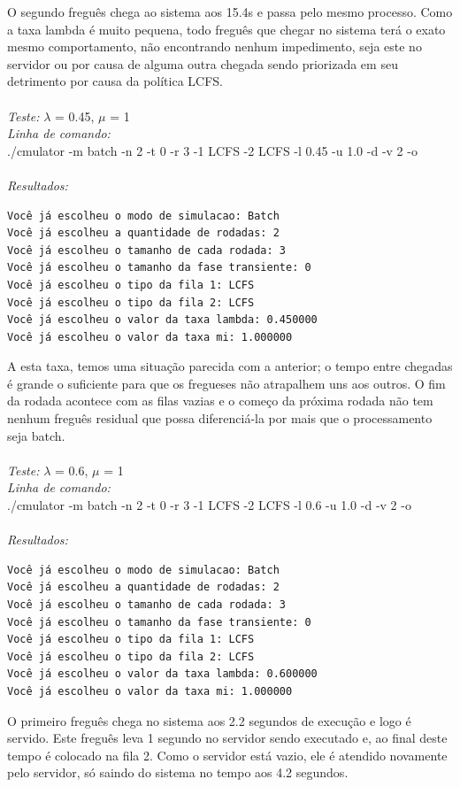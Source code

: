 \documentclass[a4paper,10pt]{article}
\begin{document}
    O segundo freguês chega ao sistema aos 15.4s e passa pelo mesmo processo. Como a taxa lambda é muito pequena, todo freguês que chegar no sistema terá o exato mesmo comportamento, não encontrando nenhum impedimento, seja este no servidor ou por causa de alguma outra chegada sendo priorizada em seu detrimento por causa da política LCFS.
\\
\\
\emph{Teste:} $\lambda$ = 0.45, $\mu$ = 1
\\
\emph{Linha de comando:}
\\
./cmulator -m batch -n 2 -t 0 -r 3 -1 LCFS -2 LCFS -l 0.45 -u 1.0 -d -v 2 -o
\\
\\
\emph{Resultados:}
\\\begin{verbatim}
Você já escolheu o modo de simulacao: Batch
Você já escolheu a quantidade de rodadas: 2
Você já escolheu o tamanho de cada rodada: 3
Você já escolheu o tamanho da fase transiente: 0
Você já escolheu o tipo da fila 1: LCFS
Você já escolheu o tipo da fila 2: LCFS
Você já escolheu o valor da taxa lambda: 0.450000
Você já escolheu o valor da taxa mi: 1.000000
\end{verbatim}
    A esta taxa, temos uma situação parecida com a anterior; o tempo entre chegadas é grande o suficiente para que os fregueses não atrapalhem uns aos outros. O fim da rodada acontece com as filas vazias e o começo da próxima rodada não tem nenhum freguês residual que possa diferenciá-la por mais que o processamento seja batch.
\\
\\
\emph{Teste:} $\lambda$ = 0.6, $\mu$ = 1
\\
\emph{Linha de comando:}
\\
./cmulator -m batch -n 2 -t 0 -r 3 -1 LCFS -2 LCFS -l 0.6 -u 1.0 -d -v 2 -o
\\
\\
\emph{Resultados:}
\begin{verbatim}
Você já escolheu o modo de simulacao: Batch
Você já escolheu a quantidade de rodadas: 2
Você já escolheu o tamanho de cada rodada: 3
Você já escolheu o tamanho da fase transiente: 0
Você já escolheu o tipo da fila 1: LCFS
Você já escolheu o tipo da fila 2: LCFS
Você já escolheu o valor da taxa lambda: 0.600000
Você já escolheu o valor da taxa mi: 1.000000
\end{verbatim}

    O primeiro freguês chega no sistema aos 2.2 segundos de execução e logo é servido. Este freguês leva 1 segundo no servidor sendo executado e, ao final deste tempo é colocado na fila 2. Como o servidor está vazio, ele é atendido novamente pelo servidor, só saindo do sistema no tempo aos 4.2 segundos.
\end{document}
